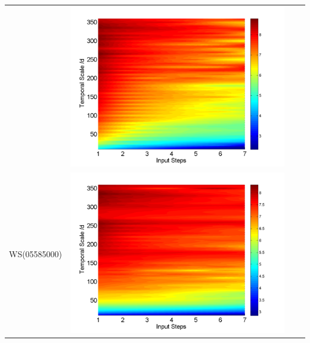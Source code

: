\documentclass[review]{elsarticle}
\begin{document}
\begin{table}[H]
\begin{tabular}{cccc}
&\begin{minipage}{.3\textwidth}\includegraphics[width=\linewidth]{resultgraph/02143000pepq_abs.png}\end{minipage}
\\
WS(05585000)
&\begin{minipage}{.3\textwidth}\includegraphics[width=\linewidth]{resultgraph/05585000p_abs.png}\end{minipage}

\end{tabular}
\end{table}
\end{document}
